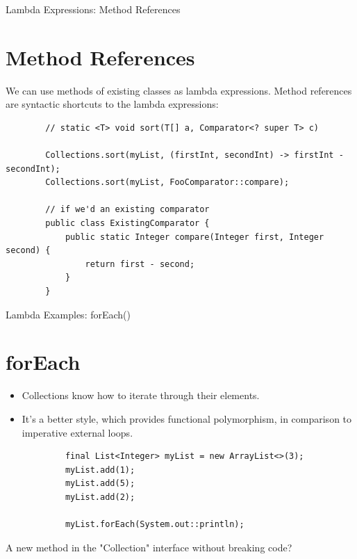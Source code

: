 \documentclass{beamer}
\begin{document}
	\begin{frame}[fragile]{Lambda Expressions: Method References}
		\section{Method References}
		We can use methods of existing classes as lambda expressions.
		Method references are syntactic shortcuts to the lambda expressions:
		\begin{lstlisting}
		// static <T> void sort(T[] a, Comparator<? super T> c)
		
		Collections.sort(myList, (firstInt, secondInt) -> firstInt - secondInt);
		Collections.sort(myList, FooComparator::compare);
		
		// if we'd an existing comparator
		public class ExistingComparator {
  			public static Integer compare(Integer first, Integer second) {
    		    return first - second;
  			}
		}
		\end{lstlisting}
		
	\end{frame}	
	
	\begin{frame}[fragile]{Lambda Examples: forEach() }
		\section{forEach}
			\begin{itemize}
				\item Collections know how to iterate through their elements.
				\item It's a better style, which provides functional polymorphism, in comparison to imperative external loops.
			\end{itemize}

			\begin{lstlisting}
    		final List<Integer> myList = new ArrayList<>(3);
    		myList.add(1);
    		myList.add(5);
    		myList.add(2);

    		myList.forEach(System.out::println);
			\end{lstlisting}
			
			A new method in the "Collection" interface without breaking code?
	\end{frame}	
\end{document}
